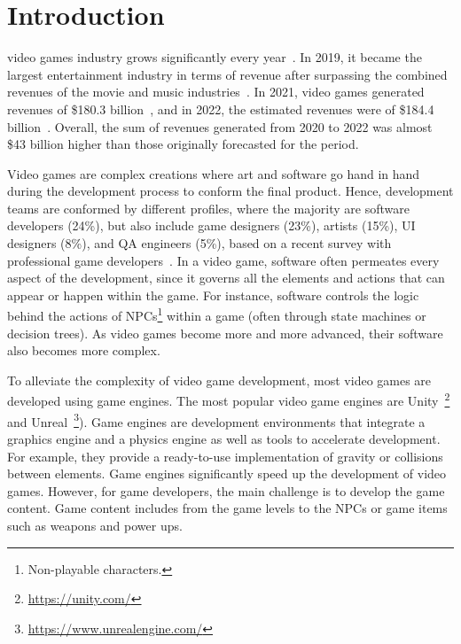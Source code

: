 \section{Introduction}

 video games industry grows significantly every year~\cite{rykala2020growth}. In 2019, it became the largest entertainment industry in terms of revenue after surpassing the combined revenues of the movie and music industries~\cite{politowski2021game}. In 2021, video games generated revenues of \$180.3 billion~\cite{wijman2021games}, and in 2022, the estimated revenues were of \$184.4 billion~\cite{wijman2022games}. Overall, the sum of revenues generated from 2020 to 2022 was almost \$43 billion higher than those originally forecasted for the period. 

Video games are complex creations where art and software go hand in hand during the development process to conform the final product. Hence, development teams are conformed by different profiles, where the majority are software developers (24\%), but also include game designers (23\%), artists (15\%), UI designers (8\%), and QA engineers (5\%), based on a recent survey with professional game developers~\cite{devNation}. In a video game, software often permeates every aspect of the development, since it governs all the elements and actions that can appear or happen within the game. For instance, software controls the logic behind the actions of NPCs\footnote{Non-playable characters.} within a game (often through state machines or decision trees). As video games become more and more advanced, their software also becomes more complex.

To alleviate the complexity of video game development, most video games are developed using game engines. The most popular video game engines are Unity~\footnote{\url{https://unity.com/}} and Unreal~\footnote{\url{https://www.unrealengine.com/}}). Game engines are development environments that integrate a graphics engine and a physics engine as well as tools to accelerate development. For example, they provide a ready-to-use implementation of gravity or collisions between elements. Game engines significantly speed up the development of video games. However, for game developers, the main challenge is to develop the game content. Game content includes from the game levels to the NPCs or game items such as weapons and power ups.

